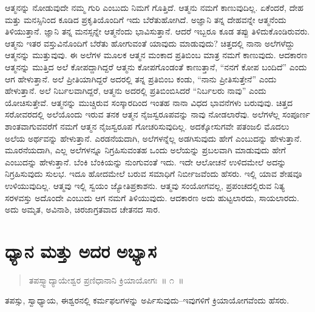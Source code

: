 ಆತ್ಮನನ್ನು ನೋಡುವುದೇ ನಮ್ಮ ಗುರಿ ಎಂಬುದು ನಿಮಗೆ ಗೊತ್ತಿದೆ. ಆತ್ಮನು ನಮಗೆ ಕಾಣುವುದಿಲ್ಲ. ಏಕೆಂದರೆ, ದೇಹ ಮತ್ತು ಮನಸ್ಸಿನಿಂದ ಕೂಡಿದ ಪ್ರಕೃತಿಯೊಂದಿಗೆ ಇದು ಬೆರೆತುಹೋಗಿದೆ. ಅಜ್ಞಾನಿ ತನ್ನ ದೇಹವನ್ನೇ ಆತ್ಮನೆಂದು ತಿಳಿಯುತ್ತಾನೆ. ಜ್ಞಾನಿ ತನ್ನ ಮನಸ್ಸನ್ನೇ ಆತ್ಮನೆಂದು ಭಾವಿಸುತ್ತಾನೆ. ಆದರೆ ಇಬ್ಬರೂ ಕೂಡ ತಪ್ಪು ತಿಳಿದುಕೊಂಡಿರುವರು. ಆತ್ಮನು ಇತರ ವಸ್ತುವಿನೊಂದಿಗೆ ಬೆರೆತು ಹೋಗುವಂತೆ ಯಾವುದು ಮಾಡುವುದು? ಚಿತ್ತದಲ್ಲಿ ನಾನಾ ಅಲೆಗಳೆದ್ದು ಆತ್ಮನನ್ನು ಮುತ್ತುವುವು. ಈ ಅಲೆಗಳ ಮೂಲಕ ಆತ್ಮನ ಮಂಕಾದ ಪ್ರತಿಬಿಂಬ ಮಾತ್ರ ನಮಗೆ ಕಾಣುವುದು. ಆದಕಾರಣ ಆತ್ಮನನ್ನು ಮುತ್ತಿದ ಅಲೆ ಕೋಪದ್ದಾಗಿದ್ದರೆ ಆತ್ಮನು ಕೋಪಗೊಂಡಂತೆ ಕಾಣುತ್ತಾನೆ, “ನನಗೆ ಕೋಪ ಬಂದಿದೆ” ಎಂದು ಆಗ ಹೇಳುತ್ತಾನೆ. ಅಲೆ ಪ್ರೀತಿಯಾಗಿದ್ದರೆ ಅದರಲ್ಲಿ ತನ್ನ ಪ್ರತಿಬಿಂಬ ಕಂಡು, “ನಾನು ಪ್ರೀತಿಸುತ್ತೇನೆ” ಎಂದು ಹೇಳುತ್ತಾನೆ. ಅಲೆ ನಿರ್ಬಲವಾಗಿದ್ದರೆ, ಆತ್ಮನು ಅದರಲ್ಲಿ ಪ್ರತಿಬಿಂಬಿಸಿದರೆ “ನಿರ್ಬಲರು ನಾವು” ಎಂದು ಯೋಚಿಸುತ್ತೇವೆ. ಆತ್ಮನನ್ನು ಮುಚ್ಚಿರುವ ಸಂಸ್ಕಾರದಿಂದ ಇಂತಹ ನಾನಾ ವಿಧದ ಭಾವನೆಗಳು ಬರುವುವು. ಚಿತ್ತದ ಸರೋವರದಲ್ಲಿ ಅಲೆಯೊಂದು ಇರುವ ತನಕ ಆತ್ಮನ ನೈಜಸ್ವರೂಪವನ್ನು ನಾವು ನೋಡಲಾರೆವು. ಅಲೆಗಳೆಲ್ಲ ಸಂಪೂರ್ಣ ಶಾಂತವಾಗುವವರೆಗೆ ನಮಗೆ ಆತ್ಮನ ನೈಜಸ್ವರೂಪ ಗೋಚರಿಸುವುದಿಲ್ಲ. ಅದಕ್ಕೋಸುಗವೇ ಪತಂಜಲಿ ಮೊದಲು ಅಲೆಯ ಅರ್ಥವನ್ನು ಹೇಳುತ್ತಾನೆ. ಎರಡನೆಯದಾಗಿ, ಅಲೆಗಳನ್ನೆಲ್ಲ ಅಡಗಿಸುವುದು ಹೇಗೆ ಎಂಬುದನ್ನು ಹೇಳುತ್ತಾನೆ. ಮೂರನೆಯದಾಗಿ, ಎಲ್ಲ ಅಲೆಗಳನ್ನೂ ನಿಗ್ರಹಿಸುವಂತಹ ಒಂದು ಅಲೆಯನ್ನು ಪ್ರಬಲವಾಗಿ ಮಾಡುವುದು ಹೇಗೆ ಎಂಬುದನ್ನು ಹೇಳುತ್ತಾನೆ. ಬೆಂಕಿ ಬೆಂಕಿಯನ್ನು ನುಂಗುವಂತೆ ಇದು. ಇದೇ ಆಲೋಚನೆ ಉಳಿದಮೇಲೆ ಅದನ್ನು ನಿಗ್ರಹಿಸುವುದು ಸುಲಭ. ಇದೂ ಹೋದಮೇಲೆ ಬರುವ ಸಮಾಧಿಗೆ ನಿರ್ಬೀಜವೆಂದು ಹೆಸರು. ಇಲ್ಲಿ ಯಾವ ಶೇಷವೂ ಉಳಿಯುವುದಿಲ್ಲ. ಆತ್ಮವು ಇಲ್ಲಿ ಸ್ವಯಂ ಜ್ಯೋತಿಪ್ರಕಾಶನು. ಆತ್ಮವು ಸಂಯೋಗವಲ್ಲ, ಪ್ರಪಂಚದಲ್ಲಿರುವ ನಿತ್ಯ ಸರಳವಸ್ತು ಅದೊಂದೇ ಎಂಬುದು ಆಗ ನಮಗೆ ತಿಳಿಯುವುದು. ಆದಕಾರಣ ಅದು ಹುಟ್ಟಲಾರದು, ಸಾಯಲಾರದು. ಅದು ಅಮೃತ, ಅವಿನಾಶಿ, ಚಿರಜಾಗ್ರತವಾದ ಚೇತನದ ಸಾರ.

\chapter{ಧ್ಯಾನ ಮತ್ತು ಅದರ ಅಭ್ಯಾಸ}

\begin{verse}
ತಪಸ್ಸ್ವಾದ್ಯಾಯೇಶ್ವರ ಪ್ರಣಿಧಾನಾನಿ ಕ್ರಿಯಾಯೋಗಃ~॥ ೧~॥
\end{verse}

\vspace{-0.3cm}

ತಪಸ್ಸು, ಸ್ವಾಧ್ಯಾಯ, ಈಶ್ವರನಲ್ಲಿ ಕರ್ಮಫಲಗಳನ್ನು ಅರ್ಪಿಸುವುದು–ಇವುಗಳಿಗೆ ಕ್ರಿಯಾಯೋಗವೆಂದು ಹೆಸರು. 

